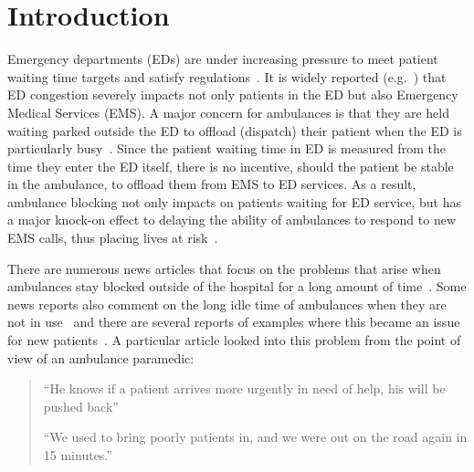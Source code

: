 \section{Introduction}

Emergency departments (EDs) are under increasing pressure to meet patient
waiting time targets and satisfy 
regulations~\cite{EmergencyDepartmentWinterPressures}.
It is widely reported (e.g.~\cite{mirror, thenews, bmj}) that ED congestion 
severely impacts not only patients in the ED but also Emergency Medical 
Services (EMS).
A major concern for ambulances is that they are held waiting parked outside the
ED to offload (dispatch) their patient when the ED is particularly 
busy~\cite{clarey2014ambulance}. 
Since the patient waiting time in ED is measured from the time they enter the
ED itself, there is no incentive, should the patient be stable in the
ambulance, to offload them from EMS to ED services.
As a result, ambulance blocking not only impacts on patients waiting for ED
service, but has a major knock-on effect to delaying the ability of ambulances
to respond to new EMS calls, thus placing lives at risk~\cite{eastanglia}.

There are numerous news articles that focus on the problems that arise when 
ambulances stay blocked outside of the hospital for a long amount of 
time~\cite{dailyrecords, staffordshirelive}.
Some news reports also comment on the long idle time of ambulances when 
they are not in use~\cite{herefordtimes} and there are several reports of 
examples where this became an issue for new patients~\cite{southwalesargus}.
A particular article looked into this problem from the point of view of an 
ambulance paramedic:

\begin{quotation}
    ``He knows if a patient arrives more urgently in need of help, his will be 
    pushed back''~\cite{bbcwales}

    ``We used to bring poorly patients in, and we were out on the road again in
    15 minutes.''~\cite{bbcwales}
\end{quotation}

